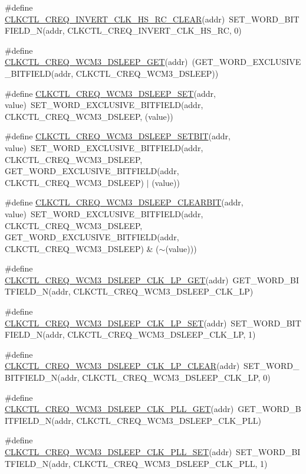 \begin{DoxyCompactItemize}
\item 
\#define \hyperlink{a00544_a75faedf6b8cfc5b27cd3207cfb6f0987}{CLKCTL\_\-CREQ\_\-INVERT\_\-CLK\_\-HS\_\-RC\_\-CLEAR}(addr)~SET\_\-WORD\_\-BITFIELD\_\-N(addr, CLKCTL\_\-CREQ\_\-INVERT\_\-CLK\_\-HS\_\-RC, 0)
\item 
\#define \hyperlink{a00544_a3c9f0449d084e8bb0e7bd673ba716b04}{CLKCTL\_\-CREQ\_\-WCM3\_\-DSLEEP\_\-GET}(addr)~(GET\_\-WORD\_\-EXCLUSIVE\_\-BITFIELD(addr, CLKCTL\_\-CREQ\_\-WCM3\_\-DSLEEP))
\item 
\#define \hyperlink{a00544_a0701e31445e0b88277c78c971088dbc5}{CLKCTL\_\-CREQ\_\-WCM3\_\-DSLEEP\_\-SET}(addr, value)~SET\_\-WORD\_\-EXCLUSIVE\_\-BITFIELD(addr, CLKCTL\_\-CREQ\_\-WCM3\_\-DSLEEP, (value))
\item 
\#define \hyperlink{a00544_a6897bfa111604cd16de374a317cb02d3}{CLKCTL\_\-CREQ\_\-WCM3\_\-DSLEEP\_\-SETBIT}(addr, value)~SET\_\-WORD\_\-EXCLUSIVE\_\-BITFIELD(addr, CLKCTL\_\-CREQ\_\-WCM3\_\-DSLEEP, GET\_\-WORD\_\-EXCLUSIVE\_\-BITFIELD(addr, CLKCTL\_\-CREQ\_\-WCM3\_\-DSLEEP) $|$ (value))
\item 
\#define \hyperlink{a00544_aaa7a3518d993e14bb4d6fc5fbf051b6d}{CLKCTL\_\-CREQ\_\-WCM3\_\-DSLEEP\_\-CLEARBIT}(addr, value)~SET\_\-WORD\_\-EXCLUSIVE\_\-BITFIELD(addr, CLKCTL\_\-CREQ\_\-WCM3\_\-DSLEEP, GET\_\-WORD\_\-EXCLUSIVE\_\-BITFIELD(addr, CLKCTL\_\-CREQ\_\-WCM3\_\-DSLEEP) \& ($\sim$(value)))
\item 
\#define \hyperlink{a00544_a0d0cb856981e16a1bd5c687a0158b379}{CLKCTL\_\-CREQ\_\-WCM3\_\-DSLEEP\_\-CLK\_\-LP\_\-GET}(addr)~GET\_\-WORD\_\-BITFIELD\_\-N(addr, CLKCTL\_\-CREQ\_\-WCM3\_\-DSLEEP\_\-CLK\_\-LP)
\item 
\#define \hyperlink{a00544_a28c9395009822c48c447c1833e82d725}{CLKCTL\_\-CREQ\_\-WCM3\_\-DSLEEP\_\-CLK\_\-LP\_\-SET}(addr)~SET\_\-WORD\_\-BITFIELD\_\-N(addr, CLKCTL\_\-CREQ\_\-WCM3\_\-DSLEEP\_\-CLK\_\-LP, 1)
\item 
\#define \hyperlink{a00544_a92166b75b961aa5b500bd935d0dd0c93}{CLKCTL\_\-CREQ\_\-WCM3\_\-DSLEEP\_\-CLK\_\-LP\_\-CLEAR}(addr)~SET\_\-WORD\_\-BITFIELD\_\-N(addr, CLKCTL\_\-CREQ\_\-WCM3\_\-DSLEEP\_\-CLK\_\-LP, 0)
\item 
\#define \hyperlink{a00544_a60b388186e5f34970b585ec4d66d0b53}{CLKCTL\_\-CREQ\_\-WCM3\_\-DSLEEP\_\-CLK\_\-PLL\_\-GET}(addr)~GET\_\-WORD\_\-BITFIELD\_\-N(addr, CLKCTL\_\-CREQ\_\-WCM3\_\-DSLEEP\_\-CLK\_\-PLL)
\item 
\#define \hyperlink{a00544_aec2e11c58703d835deee0ba523de1725}{CLKCTL\_\-CREQ\_\-WCM3\_\-DSLEEP\_\-CLK\_\-PLL\_\-SET}(addr)~SET\_\-WORD\_\-BITFIELD\_\-N(addr, CLKCTL\_\-CREQ\_\-WCM3\_\-DSLEEP\_\-CLK\_\-PLL, 1)

\end{DoxyCompactItemize}
